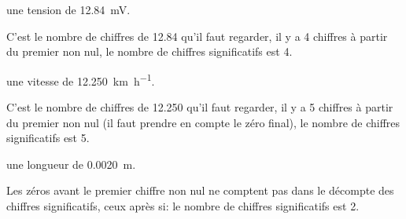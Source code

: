 

\begin{enonce}
  une tension de \SI{12,84}{\milli\volt}.
\end{enonce}


\begin{corrige}
C'est le nombre de chiffres de \num{12.84} qu'il faut regarder, il y a 4 chiffres à partir du premier non nul, le nombre de chiffres significatifs est {4}.
\end{corrige}



\begin{enonce}
une vitesse de \SI{12,250}{\kilo\metre\per\hour}.
\end{enonce}


\begin{corrige}
C'est le nombre de chiffres de \num{12.250} qu'il faut regarder, il y a 5 chiffres à partir du premier non nul (il faut prendre en compte le zéro final), le nombre de chiffres significatifs est {5}.
\end{corrige}



\begin{enonce}
une longueur de \SI{0,0020}{\metre}.
\end{enonce}


\begin{corrige}
Les zéros avant le premier chiffre non nul ne comptent pas dans le décompte des chiffres significatifs, ceux après si: le nombre de chiffres significatifs est {2}.
\end{corrige}


\finEntrainement







